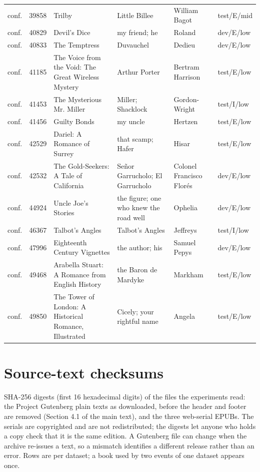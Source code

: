 \documentclass[11pt]{article}
\begin{document}
{\begin{longtable}{p{0.9cm}p{0.9cm}p{4.0cm}p{3.3cm}p{3.0cm}p{1.8cm}}
conf. & 39858 & Trilby & Little Billee & William Bagot & test/E/mid \\
conf. & 40829 & Devil's Dice & my friend; he & Roland & dev/E/low \\
conf. & 40833 & The Temptress & Duvauchel & Dedieu & dev/E/low \\
conf. & 41185 & The Voice from the Void: The Great Wireless Mystery & Arthur Porter & Bertram Harrison & test/E/low \\
conf. & 41453 & The Mysterious Mr. Miller & Miller; Shacklock & Gordon-Wright & test/I/low \\
conf. & 41456 & Guilty Bonds & my uncle & Hertzen & test/E/low \\
conf. & 42529 & Dariel: A Romance of Surrey & that scamp; Hafer & Hisar & test/E/low \\
conf. & 42532 & The Gold-Seekers: A Tale of California & Señor Garrucholo; El Garrucholo & Colonel Francisco Florés & dev/E/low \\
conf. & 44924 & Uncle Joe's Stories & the figure; one who knew the road well & Ophelia & dev/E/low \\
conf. & 46367 & Talbot's Angles & Talbot's Angles & Jeffreys & test/I/low \\
conf. & 47996 & Eighteenth Century Vignettes & the author; his & Samuel Pepys & dev/E/low \\
conf. & 49468 & Arabella Stuart: A Romance from English History & the Baron de Mardyke & Markham & test/E/low \\
conf. & 49850 & The Tower of London: A Historical Romance, Illustrated & Cicely; your rightful name & Angela & test/E/low \\
\bottomrule\end{longtable}}
\section{Source-text checksums}
SHA-256 digests (first 16 hexadecimal digits) of the files the experiments read: the Project Gutenberg plain texts as downloaded, before the header and footer are removed (Section 4.1 of the main text), and the three web-serial EPUBs. The serials are copyrighted and are not redistributed; the digests let anyone who holds a copy check that it is the same edition. A Gutenberg file can change when the archive re-issues a text, so a mismatch identifies a different release rather than an error. Rows are per dataset; a book used by two events of one dataset appears once.
\end{document}

